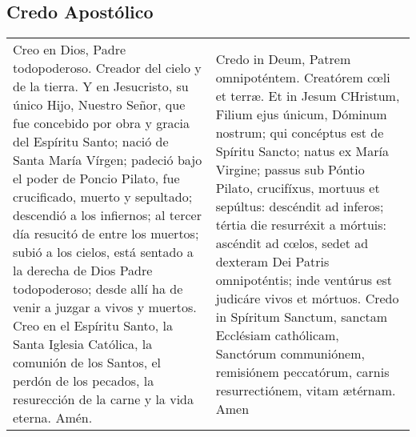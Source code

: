 \documentclass[./devocionario.tex]{subfiles}
\begin{document}
    \subsection*{Credo Apostólico}
    \begin{tabular} { p{} p{} }
        Creo en Dios, Padre todopoderoso. Creador del cielo y de la tierra. Y en Jesucristo, su único Hijo, Nuestro Señor, 
        que fue concebido por obra y gracia del Espíritu Santo; nació de Santa María Vírgen; padeció bajo el poder de Poncio Pilato, 
        fue crucificado, muerto y sepultado; descendió a los infiernos; al tercer día resucitó de entre los muertos; subió a los cielos, 
        está sentado a la derecha de Dios Padre todopoderoso; desde allí ha de venir a juzgar a vivos y muertos. 
        Creo en el Espíritu Santo, la Santa Iglesia Católica, la comunión de los Santos, el perdón de los pecados, 
        la resurección de la carne y la vida eterna. Amén.

        &

        Credo in Deum, Patrem omnipoténtem. Creatórem cœli et terræ. Et in Jesum CHristum, Filium ejus únicum, Dóminum nostrum; 
        qui concéptus est de Spíritu Sancto; natus ex María Virgine; passus sub Póntio Pilato, crucifíxus, mortuus et sepúltus: 
        descéndit ad inferos; tértia die resurréxit a mórtuis: ascéndit ad cœlos, sedet ad dexteram Dei Patris omnipoténtis; 
        inde ventúrus est judicáre vivos et mórtuos. Credo in Spíritum Sanctum, sanctam Ecclésiam cathólicam, Sanctórum communiónem, 
        remisiónem peccatórum, carnis resurrectiónem, vitam ætérnam. Amen
    \end{tabular}
\end{document}

